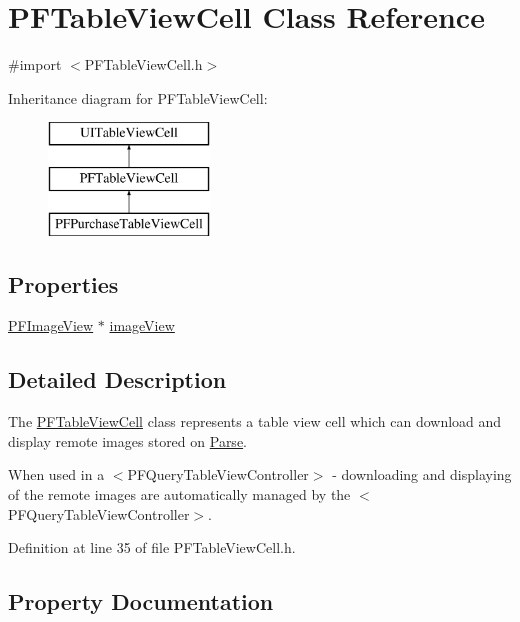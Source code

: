 \hypertarget{interface_p_f_table_view_cell}{}\section{P\+F\+Table\+View\+Cell Class Reference}
\label{interface_p_f_table_view_cell}


{\ttfamily \#import $<$P\+F\+Table\+View\+Cell.\+h$>$}

Inheritance diagram for P\+F\+Table\+View\+Cell\+:\begin{figure}[H]
\begin{center}
\leavevmode
\includegraphics[height=3.000000cm]{interface_p_f_table_view_cell}
\end{center}
\end{figure}
\subsection*{Properties}
\begin{DoxyCompactItemize}
\item 
\hyperlink{interface_p_f_image_view}{P\+F\+Image\+View} $\ast$ \hyperlink{interface_p_f_table_view_cell_a7a0539734c5a2d002fba791497adbfa2}{image\+View}
\end{DoxyCompactItemize}


\subsection{Detailed Description}
The {\ttfamily \hyperlink{interface_p_f_table_view_cell}{P\+F\+Table\+View\+Cell}} class represents a table view cell which can download and display remote images stored on \hyperlink{interface_parse}{Parse}.

When used in a $<$\+P\+F\+Query\+Table\+View\+Controller$>$ -\/ downloading and displaying of the remote images are automatically managed by the $<$\+P\+F\+Query\+Table\+View\+Controller$>$. 

Definition at line 35 of file P\+F\+Table\+View\+Cell.\+h.



\subsection{Property Documentation}
\hypertarget{interface_p_f_table_view_cell_a7a0539734c5a2d002fba791497adbfa2}{}
